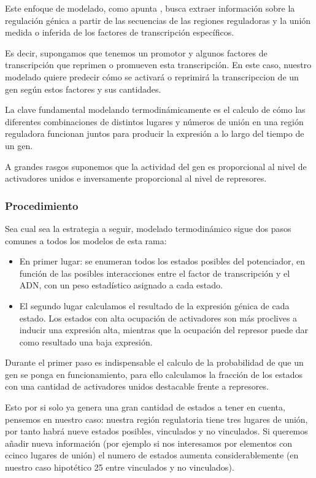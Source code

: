  Este enfoque de modelado, como apunta \cite{ay2011mathematical}, busca extraer información sobre la regulación génica a partir de las secuencias de las regiones reguladoras y la unión medida o inferida de los factores de transcripción específicos.
 
 Es decir, supongamos que tenemos un promotor y algunos factores de transcripción que reprimen o promueven esta transcripción. En este caso, nuestro modelado quiere predecir cómo se activará o reprimirá la transcripccion de un gen según estos factores y sus cantidades.
 
 
 La clave fundamental modelando termodinámicamente es el calculo de cómo las diferentes combinaciones de distintos lugares y números de unión en una región reguladora funcionan juntos para producir la expresión a lo largo del tiempo de un gen.
 
 A grandes rasgos suponemos que la actividad del gen es proporcional al nivel de activadores unidos e inversamente proporcional al nivel de represores.
 
 \subsubsection{Procedimiento}
 
  Sea cual sea la estrategia a seguir, modelado termodinámico sigue dos pasos comunes a todos los modelos de esta rama:
  \begin{itemize}
  	\item En primer lugar: se enumeran todos los estados posibles del potenciador, en función de las posibles interacciones entre el factor de transcripción y el ADN, con un peso estadístico asignado a cada estado.
  	\item  El segundo lugar calculamos el resultado de la expresión génica de cada estado. Los estados con alta ocupación de activadores son más proclives a inducir una expresión alta, mientras que la ocupación del represor puede dar como resultado una baja expresión.
  \end{itemize}
  
   Durante el primer paso es indispensable el calculo de la probabilidad de que un gen se ponga en funcionamiento, para ello calculamos la fracción de los estados con una cantidad de activadores unidos destacable frente a represores.
   
   Esto por si solo ya genera una gran cantidad de estados a tener en cuenta, pensemos en nuestro caso: nuestra región regulatoria tiene tres lugares de unión, por tanto habrá nueve estados posibles, vinculados y no vinculados. Si queremos añadir nueva información (por ejemplo si nos interesamos por elementos con ccinco lugares de unión) el numero de estados aumenta considerablemente (en nuestro caso hipotético 25 entre vinculados y no vinculados).
 
